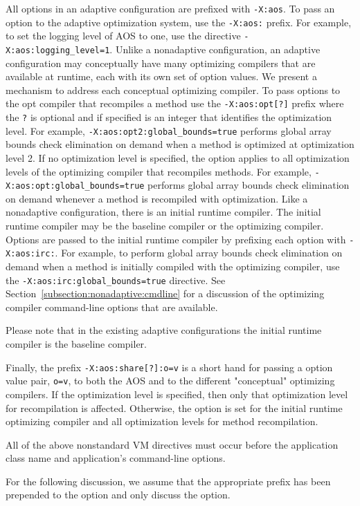 All options in an adaptive configuration are prefixed with {\tt -X:aos}.
To pass an option to the adaptive optimization system, use the {\tt -X:aos:} 
prefix. 
For example, to set the logging level of AOS to one, use the directive
{\tt -X:aos:logging\_level=1}.
Unlike a nonadaptive configuration, an adaptive configuration may 
conceptually have many optimizing compilers that are available at runtime,
each with its own set of option values.
We present a mechanism to address each conceptual optimizing compiler.
To pass options to the opt compiler that recompiles a method
use the {\tt -X:aos:opt[?]} prefix where the {\tt ?} is optional and 
if specified is an integer that identifies the optimization level.
For example, {\tt -X:aos:opt2:global\_bounds=true} performs 
global array bounds check elimination on demand when a method is 
optimized at optimization level 2.
If no optimization level is specified, the option applies to all 
optimization levels of the optimizing compiler that recompiles methods.
For example, {\tt -X:aos:opt:global\_bounds=true} performs 
global array bounds check elimination on demand whenever a method is 
recompiled with optimization.
Like a nonadaptive configuration, there is an initial runtime compiler.
The initial runtime compiler may be the baseline compiler or the 
optimizing compiler. Options are passed to the initial runtime compiler
by prefixing each option with {\tt -X:aos:irc:}.
For example, to perform global array bounds check elimination on demand
when a method is initially compiled with the optimizing compiler,
use the {\tt -X:aos:irc:global\_bounds=true} directive.
See Section~\ref{subsection:nonadaptive:cmdline} for a discussion of the
optimizing compiler command-line options that are available.

Please note that in the existing adaptive configurations the 
initial runtime compiler is the baseline compiler. 

Finally, the prefix {\tt -X:aos:share[?]:o=v} is a short hand for passing a
option value pair, {\tt o=v}, to both the AOS and to the different "conceptual"
optimizing compilers.  If the optimization level is specified, then only that 
optimization level for recompilation is affected.  Otherwise, the option is set
for the initial runtime optimizing compiler and all optimization levels for
method recompilation.

All of the above nonstandard VM directives must occur before 
the application class name and application's command-line options.

For the following discussion, we assume that the appropriate prefix has been
prepended to the option and only discuss the option.

